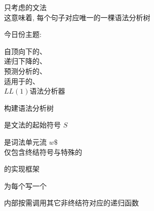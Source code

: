 
\begin{frame}{}
  \begin{center}
    只考虑的文法 \\[4pt]
    这意味着, 每个句子对应唯一的一棵语法分析树


    今日份主题: 
  \end{center}
\end{frame}

\begin{frame}{}
  \begin{center}
    自顶向下的、\\[15pt]
    递归下降的、\\[15pt]
    预测分析的、\\[15pt]
    适用于的、\\[15pt]
    $LL(1)$语法分析器
  \end{center}
\end{frame}

\begin{frame}{}
  \begin{center}
    {\large {}构建语法分析树}

    \vspace{0.60cm}
    是文法的起始符号 $S$


    \vspace{0.80cm}
    是词法单元流 $w\$$ \\[8pt]
    仅包含终结符号与特殊的
  \end{center}
\end{frame}

\begin{frame}{}
  \begin{center}
    {\large {}的实现框架}


    为每个写一个

    \vspace{0.20cm}
    内部按需调用其它非终结符对应的递归函数
  \end{center}
\end{frame}

